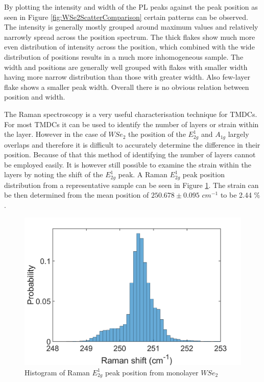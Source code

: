 By plotting the intensity and width of the PL peaks against the peak position as seen in Figure \ref{fig:WSe2ScatterComparison} certain patterns can be observed. The intensity is generally mostly grouped around maximum values and relatively narrowly spread across the position spectrum. The thick flakes show much more even distribution of intensity across the position, which combined with the wide distribution of positions results in a much more inhomogeneous sample.  The width and positions are generally well grouped with flakes with smaller width having more narrow distribution than those with greater width. Also few-layer flake shows a smaller peak width. Overall there is no obvious relation between position and width. 


The Raman spectroscopy is a very useful characterisation technique for TMDCs. For most TMDCs it can be used to identify the number of layers or strain within the layer. However in the case of $WSe_2$ the position of the $E^1_{2g}$ and $A_{1g}$ largely overlaps and therefore it is difficult to accurately determine the difference in their position. Because of that this method of identifying the number of layers cannot be employed easily. It is however still possible to examine the strain within the layers by noting the shift of the $E^1_{2g}$ peak. A Raman $E^1_{2g}$ peak position distribution from a representative sample can be seen in Figure \ref{fig:WSe2RamanPositionHistogram1}. The strain can be then determined from the mean position of $250.678 \pm 0.095$ $cm^{-1}$  to be 2.44 {\%} \cite{Dadgar2018}.

\begin{figure}[!h]
	\begin{center}
		\includegraphics[scale=0.3]{WSe2/WSe2RamanPositionHistogram1.png}
		\caption{Histogram of Raman $E^1_{2g}$ peak position from monolayer $WSe_2$}
		\label{fig:WSe2RamanPositionHistogram1}
	\end{center}
\end{figure}


